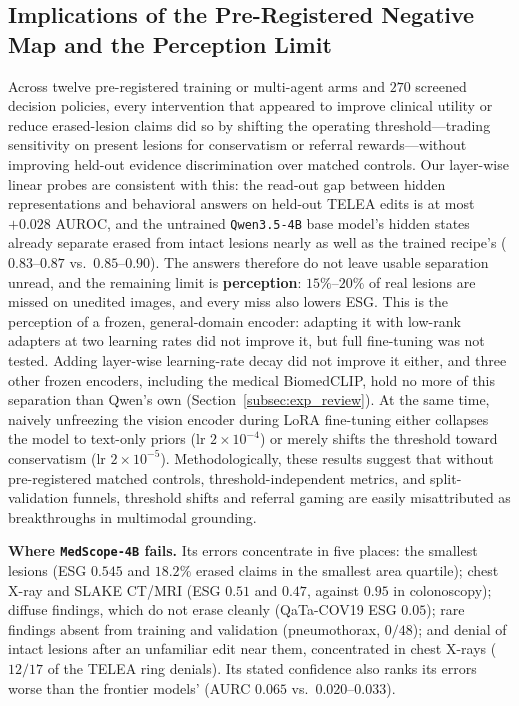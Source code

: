 \documentclass[5p,times,twocolumn,authoryear]{elsarticle}
\begin{document}
\subsection{Implications of the Pre-Registered Negative Map and the Perception Limit}
\label{subsec:disc_negative_map}
Across twelve pre-registered training or multi-agent arms and $270$ screened decision policies, every intervention that appeared to improve clinical utility or reduce erased-lesion claims did so by shifting the operating threshold---trading sensitivity on present lesions for conservatism or referral rewards---without improving held-out evidence discrimination over matched controls. Our layer-wise linear probes are consistent with this: the read-out gap between hidden representations and behavioral answers on held-out TELEA edits is at most $+0.028$ AUROC, and the untrained \texttt{Qwen3.5-4B} base model's hidden states already separate erased from intact lesions nearly as well as the trained recipe's ($0.83\text{--}0.87$ vs.\ $0.85\text{--}0.90$). The answers therefore do not leave usable separation unread, and the remaining limit is \textbf{perception}: $15\%\text{--}20\%$ of real lesions are missed on unedited images, and every miss also lowers ESG. This is the perception of a frozen, general-domain encoder: adapting it with low-rank adapters at two learning rates did not improve it, but full fine-tuning was not tested. Adding layer-wise learning-rate decay did not improve it either, and three other frozen encoders, including the medical BiomedCLIP, hold no more of this separation than Qwen's own (Section~\ref{subsec:exp_review}). At the same time, naively unfreezing the vision encoder during LoRA fine-tuning either collapses the model to text-only priors ($\text{lr } 2\times 10^{-4}$) or merely shifts the threshold toward conservatism ($\text{lr } 2\times 10^{-5}$). Methodologically, these results suggest that without pre-registered matched controls, threshold-independent metrics, and split-validation funnels, threshold shifts and referral gaming are easily misattributed as breakthroughs in multimodal grounding.

\textbf{Where \texttt{MedScope-4B} fails.} Its errors concentrate in five places: the smallest lesions (ESG $0.545$ and $18.2\%$ erased claims in the smallest area quartile); chest X-ray and SLAKE CT/MRI (ESG $0.51$ and $0.47$, against $0.95$ in colonoscopy); diffuse findings, which do not erase cleanly (QaTa-COV19 ESG $0.05$); rare findings absent from training and validation (pneumothorax, $0/48$); and denial of intact lesions after an unfamiliar edit near them, concentrated in chest X-rays ($12/17$ of the TELEA ring denials). Its stated confidence also ranks its errors worse than the frontier models' (AURC $0.065$ vs.\ $0.020$--$0.033$).
\end{document}
